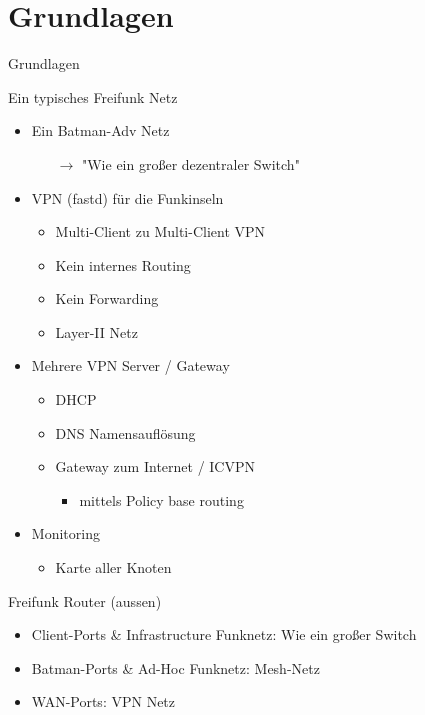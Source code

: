 \section{Grundlagen}
\begin{frame}{}
    \begin{center}
        Grundlagen
     \end{center}
\end{frame}

\begin{frame}{Ein typisches Freifunk Netz}
    \begin{itemize}
        \item Ein Batman-Adv Netz
        \begin{itemize}
            \item[$\rightarrow$] "Wie ein großer dezentraler Switch"
        \end{itemize}
        \item VPN (fastd) für die Funkinseln
        \begin{itemize}
            \item Multi-Client zu Multi-Client VPN
            \item Kein internes Routing
            \item Kein Forwarding
            \item Layer-II Netz
        \end{itemize}
        \item Mehrere VPN Server / Gateway
        \begin{itemize}
            \item DHCP
            \item DNS Namensauflösung
            \item Gateway zum Internet / ICVPN
            \begin{itemize}
                \item \zb{} mittels Policy base routing
            \end{itemize}
        \end{itemize}
        \item Monitoring
        \begin{itemize}
            \item Karte aller Knoten
        \end{itemize}
    \end{itemize}
\end{frame}

\begin{frame}{Freifunk Router (aussen)}
    \begin{itemize}
        \item Client-Ports \& Infrastructure Funknetz:
            Wie ein großer Switch
        \item Batman-Ports \& Ad-Hoc Funknetz:
            Mesh-Netz
        \item WAN-Ports:
            VPN Netz
    \end{itemize}
\end{frame}

